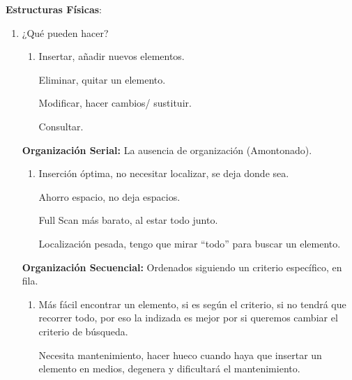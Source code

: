 \documentclass[12pt, twoside, openright]{report} %
\begin{document}
  \textbf{Estructuras Físicas}:

  \begin{enumerate}
  \item ¿Qué pueden hacer?
    

    \begin{enumerate}
    \item Insertar, añadir nuevos elementos.
      

      
      Eliminar, quitar un elemento.
      

      
      Modificar, hacer cambios/ sustituir.
      

      
      Consultar.
      
    \end{enumerate}

    
    \textbf{Organización Serial:} La ausencia de organización
    (Amontonado).
    

    \begin{enumerate}
    \item Inserción óptima, no necesitar localizar, se deja donde sea.
      

      
      Ahorro espacio, no deja espacios.
      

      
      Full Scan más barato, al estar todo junto.
      

      
      Localización pesada, tengo que mirar \enquote{todo} para buscar un
      elemento.
      
    \end{enumerate}
\pagebreak
    
    \textbf{Organización Secuencial:} Ordenados siguiendo un criterio
    específico, en fila.
    

    \begin{enumerate}
    \item Más fácil encontrar un elemento, si es según el criterio, si no
      tendrá que recorrer todo, por eso la indizada es mejor por si
      queremos cambiar el criterio de búsqueda.
      

      
      Necesita mantenimiento, hacer hueco cuando haya que insertar un
      elemento en medios, degenera y dificultará el mantenimiento.
      
    \end{enumerate}


\end{enumerate}
\end{document}
